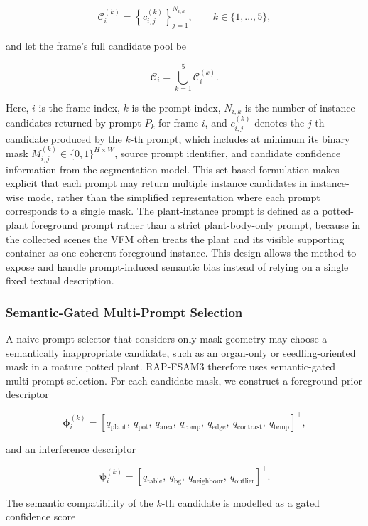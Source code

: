 \documentclass[a4paper]{cas-sc}
\begin{document}
\[
\mathcal{C}_i^{(k)}=\left\{c_{i,j}^{(k)}\right\}_{j=1}^{N_{i,k}},\qquad k\in\{1,\ldots,5\},
\]

and let the frame's full candidate pool be

\[
\mathcal{C}_i=\bigcup_{k=1}^{5}\mathcal{C}_i^{(k)}.
\]

Here, \(i\) is the frame index, \(k\) is the prompt index, \(N_{i,k}\) is the number of instance candidates returned by prompt \(P_k\) for frame \(i\), and \(c_{i,j}^{(k)}\) denotes the \(j\)-th candidate produced by the \(k\)-th prompt, which includes at minimum its binary mask \(M_{i,j}^{(k)}\in\{0,1\}^{H\times W}\), source prompt identifier, and candidate confidence information from the segmentation model. This set-based formulation makes explicit that each prompt may return multiple instance candidates in instance-wise mode, rather than the simplified representation where each prompt corresponds to a single mask. The plant-instance prompt is defined as a potted-plant foreground prompt rather than a strict plant-body-only prompt, because in the collected scenes the VFM often treats the plant and its visible supporting container as one coherent foreground instance. This design allows the method to expose and handle prompt-induced semantic bias instead of relying on a single fixed textual description.

\subsubsection{Semantic-Gated Multi-Prompt Selection}\label{sec:semantic-gated-selection}

A naive prompt selector that considers only mask geometry may choose a semantically inappropriate candidate, such as an organ-only or seedling-oriented mask in a mature potted plant. RAP-FSAM3 therefore uses semantic-gated multi-prompt selection. For each candidate mask, we construct a foreground-prior descriptor

\[
\boldsymbol{\phi}_i^{(k)}=\left[
q_{\text{plant}},\ q_{\text{pot}},\ q_{\text{area}},\ q_{\text{comp}},\ q_{\text{edge}},\ q_{\text{contrast}},\ q_{\text{temp}}
\right]^{\top},
\]

and an interference descriptor

\[
\boldsymbol{\psi}_i^{(k)}=\left[
q_{\text{table}},\ q_{\text{bg}},\ q_{\text{neighbour}},\ q_{\text{outlier}}
\right]^{\top}.
\]

The semantic compatibility of the \(k\)-th candidate is modelled as a gated confidence score
\end{document}
